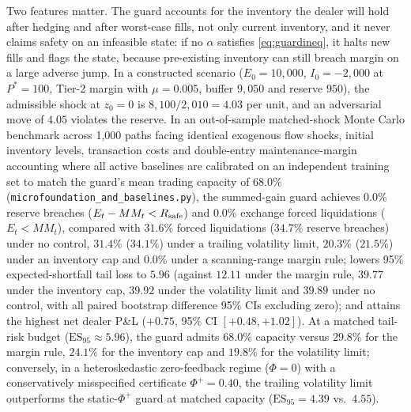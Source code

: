 Two features matter. The guard accounts for the inventory the dealer will hold after hedging and after worst-case fills, not only current inventory, and it never claims safety on an infeasible state: if no $\alpha$ satisfies \eqref{eq:guardineq}, it halts new fills and flags the state, because pre-existing inventory can still breach margin on a large adverse jump. In a constructed scenario ($E_0=10{,}000$, $I_0=-2{,}000$ at $P^*=100$, Tier-2 margin with $\mu=0.005$, buffer $9{,}050$ and reserve $950$), the admissible shock at $z_0=0$ is $8{,}100/2{,}010=4.03$ per unit, and an adversarial move of $4.05$ violates the reserve. In an out-of-sample matched-shock Monte Carlo benchmark across 1{,}000 paths facing identical exogenous flow shocks, initial inventory levels, transaction costs and double-entry maintenance-margin accounting where all active baselines are calibrated on an independent training set to match the guard's mean trading capacity of $68.0\%$ (\texttt{microfoundation\_and\_baselines.py}), the summed-gain guard achieves $0.0\%$ reserve breaches ($E_t-MM_t<R_{\rm safe}$) and $0.0\%$ exchange forced liquidations ($E_t<MM_t$), compared with $31.6\%$ forced liquidations ($34.7\%$ reserve breaches) under no control, $31.4\%$ ($34.1\%$) under a trailing volatility limit, $20.3\%$ ($21.5\%$) under an inventory cap and $0.0\%$ under a scanning-range margin rule; lowers 95\% expected-shortfall tail loss to $5.96$ (against $12.11$ under the margin rule, $39.77$ under the inventory cap, $39.92$ under the volatility limit and $39.89$ under no control, with all paired bootstrap difference 95\% CIs excluding zero); and attains the highest net dealer P\&L ($+0.75$, 95\% CI $[+0.48,+1.02]$). At a matched tail-risk budget ($\mathrm{ES}_{95}\approx 5.96$), the guard admits $68.0\%$ capacity versus $29.8\%$ for the margin rule, $24.1\%$ for the inventory cap and $19.8\%$ for the volatility limit; conversely, in a heteroskedastic zero-feedback regime ($\Phi=0$) with a conservatively misspecified certificate $\Phi^+=0.40$, the trailing volatility limit outperforms the static-$\Phi^+$ guard at matched capacity ($\mathrm{ES}_{95}=4.39$ vs.\ $4.55$).


